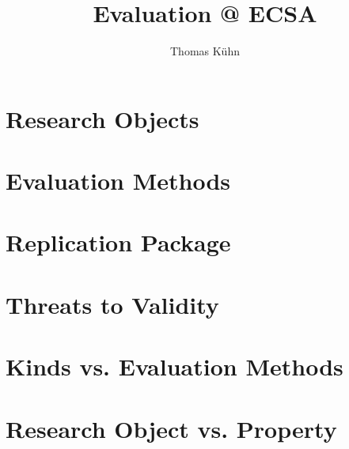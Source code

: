 \documentclass[a4paper, 11pt, twoside=semi]{scrartcl}
\author{Thomas Kühn}
\title{Evaluation @ ECSA}
\begin{document}
\section{Research Objects}






\section{Evaluation Methods}






\section{Replication Package}










\section{Threats to Validity}





\section{Kinds vs. Evaluation Methods}







\section{Research Object vs. Property}






\end{document}
